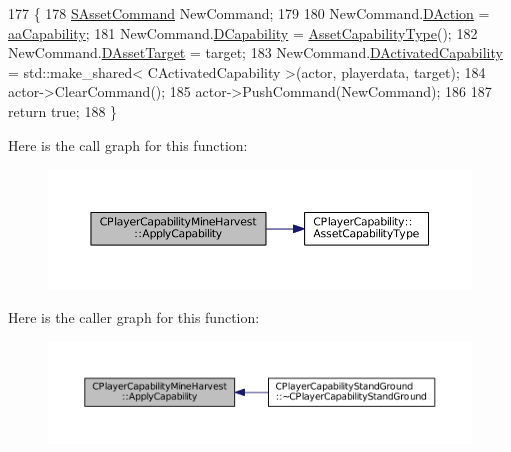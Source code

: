 \begin{DoxyCode}
177                                                                                                            
                                                               \{
178     \hyperlink{structSAssetCommand}{SAssetCommand} NewCommand;
179     
180     NewCommand.\hyperlink{structSAssetCommand_a8edd3b3d59a76d5514ba403bc8076a75}{DAction} = \hyperlink{GameDataTypes_8h_ab47668e651a3032cfb9c40ea2d60d670acf9fb164e8abd71c71f4a8c7fda360d4}{aaCapability};
181     NewCommand.\hyperlink{structSAssetCommand_a734ea7c6847457b437360f333f570ff9}{DCapability} = \hyperlink{classCPlayerCapability_a433bb196cd6ab6a932f1cac102b3aa98}{AssetCapabilityType}();
182     NewCommand.\hyperlink{structSAssetCommand_a3d9b43f6e59c386c48c41a65448a0c39}{DAssetTarget} = target;
183     NewCommand.\hyperlink{structSAssetCommand_ad8beda19520811cc70fe1eab16c774dd}{DActivatedCapability} = std::make\_shared< CActivatedCapability >(actor, 
      playerdata, target);
184     actor->ClearCommand();
185     actor->PushCommand(NewCommand);
186 
187     \textcolor{keywordflow}{return} \textcolor{keyword}{true};
188 \}
\end{DoxyCode}
Here is the call graph for this function\+:\nopagebreak
\begin{figure}[H]
\begin{center}
\leavevmode
\includegraphics[width=350pt]{classCPlayerCapabilityMineHarvest_a76a72fe97148f5026e67aab24ab21b21_cgraph}
\end{center}
\end{figure}
Here is the caller graph for this function\+:\nopagebreak
\begin{figure}[H]
\begin{center}
\leavevmode
\includegraphics[width=350pt]{classCPlayerCapabilityMineHarvest_a76a72fe97148f5026e67aab24ab21b21_icgraph}
\end{center}
\end{figure}
\hypertarget{classCPlayerCapabilityMineHarvest_a31da799cc9bc9be9f986bd878d13283a}{}\label{classCPlayerCapabilityMineHarvest_a31da799cc9bc9be9f986bd878d13283a} 
